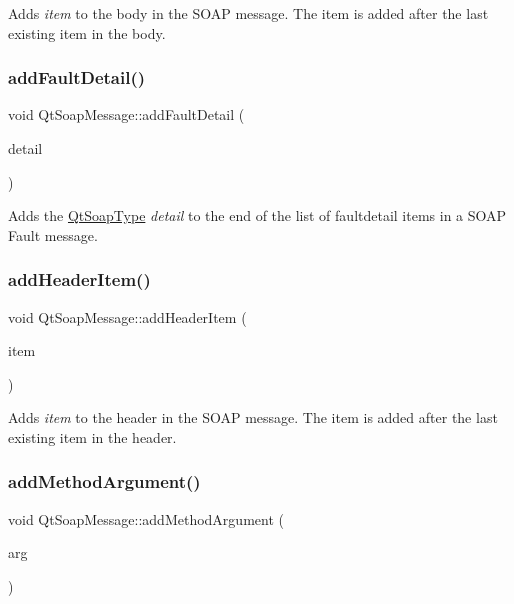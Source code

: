 Adds {\itshape item} to the body in the S\+O\+AP message. The item is added after the last existing item in the body. \mbox{\label{class_qt_soap_message_af0cd7c0da675f83e91dcc5c29faf7382}} 
\subsubsection{\texorpdfstring{add\+Fault\+Detail()}{addFaultDetail()}}
{\footnotesize\ttfamily void Qt\+Soap\+Message\+::add\+Fault\+Detail (\begin{DoxyParamCaption}\item[{\mbox{\hyperlink{class_qt_soap_type}{Qt\+Soap\+Type}} $\ast$}]{detail }\end{DoxyParamCaption})}

Adds the \mbox{\hyperlink{class_qt_soap_type}{Qt\+Soap\+Type}} {\itshape detail} to the end of the list of faultdetail items in a S\+O\+AP Fault message. \mbox{\label{class_qt_soap_message_a61b9c16754a167088a107eb34473683e}} 
\subsubsection{\texorpdfstring{add\+Header\+Item()}{addHeaderItem()}}
{\footnotesize\ttfamily void Qt\+Soap\+Message\+::add\+Header\+Item (\begin{DoxyParamCaption}\item[{\mbox{\hyperlink{class_qt_soap_type}{Qt\+Soap\+Type}} $\ast$}]{item }\end{DoxyParamCaption})}

Adds {\itshape item} to the header in the S\+O\+AP message. The item is added after the last existing item in the header. \mbox{\label{class_qt_soap_message_a07c31536525e366258d54c75d955de50}} 
\subsubsection{\texorpdfstring{add\+Method\+Argument()}{addMethodArgument()}\hspace{0.1cm}{\footnotesize\ttfamily [1/4]}}
{\footnotesize\ttfamily void Qt\+Soap\+Message\+::add\+Method\+Argument (\begin{DoxyParamCaption}\item[{\mbox{\hyperlink{class_qt_soap_type}{Qt\+Soap\+Type}} $\ast$}]{arg }\end{DoxyParamCaption})}

